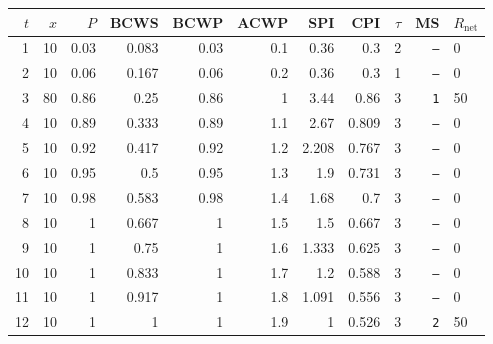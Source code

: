 \documentclass[12pt, a4paper]{article}
\begin{document}
\begin{center}
\begin{tabular}{rrrrrrrrrrl}
\toprule
$t$ & $x$ & $P$ & BCWS & BCWP & ACWP & SPI & CPI & $\tau$ & MS & $R_{\mathrm{net}}$\\
\midrule
1 & 10 & 0.03 & 0.083 & 0.03 & 0.1 & 0.36 & 0.3 & 2 & \texttt{---} & 0 \\
2 & 10 & 0.06 & 0.167 & 0.06 & 0.2 & 0.36 & 0.3 & 1 & \texttt{---} & 0 \\
3 & 80 & 0.86 & 0.25 & 0.86 & 1 & 3.44 & 0.86 & 3 & \texttt{1} & 50 \\
4 & 10 & 0.89 & 0.333 & 0.89 & 1.1 & 2.67 & 0.809 & 3 & \texttt{---} & 0 \\
5 & 10 & 0.92 & 0.417 & 0.92 & 1.2 & 2.208 & 0.767 & 3 & \texttt{---} & 0 \\
6 & 10 & 0.95 & 0.5 & 0.95 & 1.3 & 1.9 & 0.731 & 3 & \texttt{---} & 0 \\
7 & 10 & 0.98 & 0.583 & 0.98 & 1.4 & 1.68 & 0.7 & 3 & \texttt{---} & 0 \\
8 & 10 & 1 & 0.667 & 1 & 1.5 & 1.5 & 0.667 & 3 & \texttt{---} & 0 \\
9 & 10 & 1 & 0.75 & 1 & 1.6 & 1.333 & 0.625 & 3 & \texttt{---} & 0 \\
10 & 10 & 1 & 0.833 & 1 & 1.7 & 1.2 & 0.588 & 3 & \texttt{---} & 0 \\
11 & 10 & 1 & 0.917 & 1 & 1.8 & 1.091 & 0.556 & 3 & \texttt{---} & 0 \\
12 & 10 & 1 & 1 & 1 & 1.9 & 1 & 0.526 & 3 & \texttt{2} & 50 \\
\bottomrule
\end{tabular}
\end{center}
\end{document}
